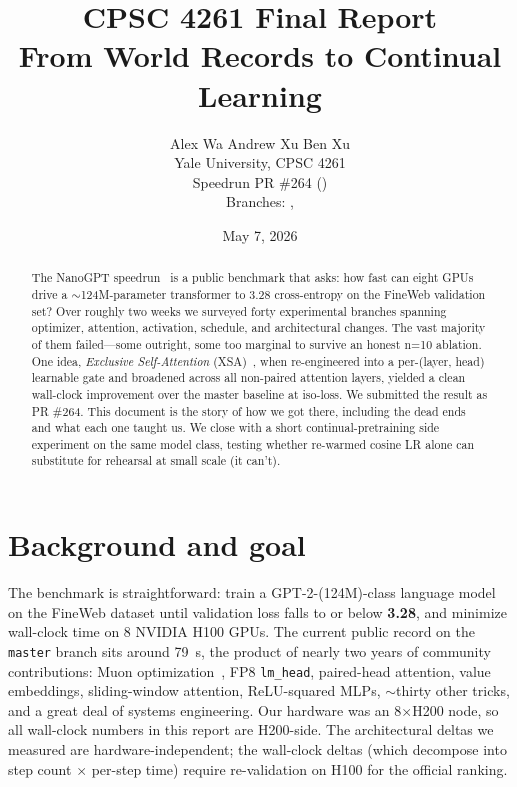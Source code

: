 \documentclass[10pt,letterpaper]{article}
\title{\vspace{-2em}\Large\bf CPSC 4261 Final Report\\[0.2em]
\large From World Records to Continual Learning}
\author{
  Alex Wa \quad Andrew Xu \quad Ben Xu\\[0.4em]
  \normalsize Yale University, CPSC 4261\\
  \normalsize Speedrun PR \#264 (\href{https://github.com/KellerJordan/modded-nanogpt/pull/264}{\code{KellerJordan/modded-nanogpt\#264}})\\
  \normalsize Branches: \href{https://github.com/djdumpling/modded-nanogpt/tree/xsa-gated-layers}{\code{xsa-gated-layers}},
  \href{https://github.com/djdumpling/modded-nanogpt/tree/cpt-rewarm-vs-rehearsal}{\code{cpt-rewarm-vs-rehearsal}}
}
\date{May 7, 2026}
\newcommand{\code}[1]{\texttt{\small #1}}
\newcommand{\val}[1]{\textbf{#1}}
\begin{document}
\maketitle
\vspace{-2em}

\begin{abstract}
\noindent
The NanoGPT speedrun~\cite{jordan_modded_nanogpt} is a public benchmark that asks: how fast can eight GPUs drive a $\sim$124M-parameter transformer to 3.28 cross-entropy on the FineWeb validation set? Over roughly two weeks we surveyed forty experimental branches spanning optimizer, attention, activation, schedule, and architectural changes. The vast majority of them failed---some outright, some too marginal to survive an honest n=10 ablation. One idea, \emph{Exclusive Self-Attention} (XSA)~\cite{xsa_zhai}, when re-engineered into a per-(layer, head) learnable gate and broadened across all non-paired attention layers, yielded a clean wall-clock improvement over the master baseline at iso-loss. We submitted the result as PR \#264. This document is the story of how we got there, including the dead ends and what each one taught us. We close with a short continual-pretraining side experiment on the same model class, testing whether re-warmed cosine LR alone can substitute for rehearsal at small scale (it can't).
\end{abstract}

\vspace{-0.5em}

\section{Background and goal}
\label{sec:bg}

The benchmark is straightforward: train a GPT-2-(124M)-class language model on the FineWeb dataset until validation loss falls to or below \val{3.28}, and minimize wall-clock time on 8 NVIDIA H100 GPUs. The current public record on the \code{master} branch sits around 79~s, the product of nearly two years of community contributions: Muon optimization~\cite{muon_jordan}, FP8 \code{lm\_head}, paired-head attention, value embeddings, sliding-window attention, ReLU-squared MLPs, $\sim$thirty other tricks, and a great deal of systems engineering. Our hardware was an 8\(\times\)H200 node, so all wall-clock numbers in this report are H200-side. The architectural deltas we measured are hardware-independent; the wall-clock deltas (which decompose into step count $\times$ per-step time) require re-validation on H100 for the official ranking.
\end{document}
